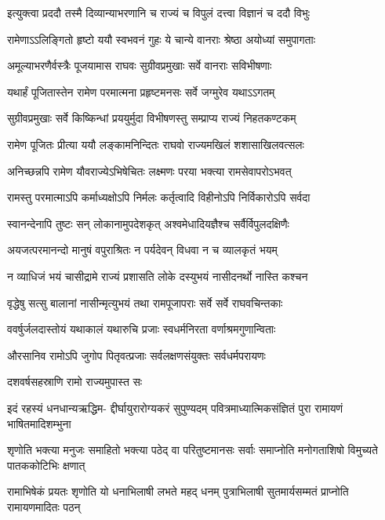 \twolineshloka
{इत्युक्त्वा प्रददौ तस्मै दिव्यान्याभरणानि च}
{राज्यं च विपुलं दत्त्वा विज्ञानं च ददौ विभुः} %

\twolineshloka
{रामेणाऽऽलिङ्गितो हृष्टो ययौ स्वभवनं गुहः}
{ये चान्ये वानराः श्रेष्ठा अयोध्यां समुपागताः} %

\twolineshloka
{अमूल्याभरणैर्वस्त्रैः पूजयामास राघवः}
{सुग्रीवप्रमुखाः सर्वे वानराः सविभीषणाः} %

\twolineshloka
{यथार्हं पूजितास्तेन रामेण परमात्मना}
{प्रहृष्टमनसः सर्वे जग्मुरेव यथाऽऽगतम्} %

\twolineshloka
{सुग्रीवप्रमुखाः सर्वे किष्किन्धां प्रययुर्मुदा}
{विभीषणस्तु सम्प्राप्य राज्यं निहतकण्टकम्} %

\twolineshloka
{रामेण पूजितः प्रीत्या ययौ लङ्कामनिन्दितः}
{राघवो राज्यमखिलं शशासाखिलवत्सलः} %

\twolineshloka
{अनिच्छन्नपि रामेण यौवराज्येऽभिषेचितः}
{लक्ष्मणः परया भक्त्या रामसेवापरोऽभवत्} %

\twolineshloka
{रामस्तु परमात्माऽपि कर्माध्यक्षोऽपि निर्मलः}
{कर्तृत्वादि विहीनोऽपि निर्विकारोऽपि सर्वदा} %

\twolineshloka
{स्वानन्देनापि तुष्टः सन् लोकानामुपदेशकृत्}
{अश्वमेधादियज्ञैश्च सर्वैर्विपुलदक्षिणैः} %

\twolineshloka
{अयजत्परमानन्दो मानुषं वपुराश्रितः}
{न पर्यदेवन् विधवा न च व्यालकृतं भयम्} %

\twolineshloka
{न व्याधिजं भयं चासीद्रामे राज्यं प्रशासति}
{लोके दस्युभयं नासीदनर्थो नास्ति कश्चन} %

\twolineshloka
{वृद्धेषु सत्सु बालानां नासीन्मृत्युभयं तथा}
{रामपूजापराः सर्वे सर्वे राघवचिन्तकाः} %

\twolineshloka
{ववर्षुर्जलदास्तोयं यथाकालं यथारुचि}
{प्रजाः स्वधर्मनिरता वर्णाश्रमगुणान्विताः} %

\twolineshloka
{औरसानिव रामोऽपि जुगोप पितृवत्प्रजाः}
{सर्वलक्षणसंयुक्तः सर्वधर्मपरायणः} %

{दशवर्षसहस्राणि रामो राज्यमुपास्त सः} %


\fourlineindentedshloka
{इदं रहस्यं धनधान्यऋद्धिम-}
{द्दीर्घायुरारोग्यकरं सुपुण्यदम्}
{पवित्रमाध्यात्मिकसंज्ञितं पुरा}
{रामायणं भाषितमादिशम्भुना} %

\fourlineindentedshloka
{शृणोति भक्त्या मनुजः समाहितो}
{भक्त्या पठेद् वा परितुष्टमानसः}
{सर्वाः समाप्नोति मनोगताशिषो}
{विमुच्यते पातककोटिभिः क्षणात्} %

\fourlineindentedshloka
{रामाभिषेकं प्रयतः शृणोति यो}
{धनाभिलाषी लभते महद् धनम्}
{पुत्राभिलाषी सुतमार्यसम्मतं}
{प्राप्नोति रामायणमादितः पठन्} %


